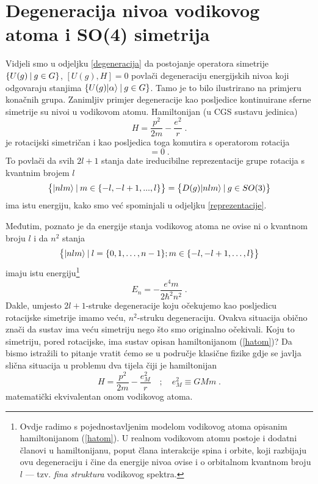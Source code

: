 \section{Degeneracija nivoa vodikovog atoma i SO(4) simetrija}
\label{so4}


Vidjeli smo u odjeljku \ref{degeneracija} da postojanje operatora
simetrije $\{U(g) \: | \: g\in G \}$, $[U(g), H] = 0$ povlači degeneraciju
energijskih nivoa koji odgovaraju stanjima $\{U(g)| \alpha \rangle \: | \: g\in
G \}$. Tamo je to bilo ilustrirano na primjeru konačnih grupa. Zanimljiv
primjer degeneracije kao posljedice kontinuirane sferne simetrije su
nivoi u vodikovom atomu. Hamiltonijan (u CGS sustavu jedinica)
\begin{equation}
    H = \frac{p^2}{2m} - \frac{e^2}{r} \;.
\label{hatom}
\end{equation}
je rotacijski simetričan i kao posljedica toga komutira s operatorom
rotacija
\begin{equation}
     [H, D(\vec{n},\phi)] = 0 \;.
\end{equation}
To povlači da svih $2l+1$ stanja date ireducibilne reprezentacije
grupe rotacija s kvantnim brojem $l$
\begin{equation}
   \big\{| nlm \rangle \: | \: m\in\{-l, -l+1, ..., l \}\big\} = 
   \big\{ D(g)| nlm \rangle \: | \: g \in SO(3) \big\}
\end{equation}
ima istu energiju, kako smo već spominjali u odjeljku \ref{reprezentacije}.

Međutim, poznato je da energije stanja vodikovog atoma ne
ovise ni o kvantnom broju $l$ i da $n^2$ stanja
\begin{equation}
\big\{| nlm \rangle \: | \: l=\{0, 1, \ldots, n-1\}; m\in\{-l, -l+1, \ldots, l \}\big\} 
\end{equation}
imaju istu energiju\footnote{Ovdje radimo s pojednostavljenim modelom vodikovog atoma
opisanim hamiltonijanom (\protect\ref{hatom}). U realnom vodikovom atomu
postoje i dodatni članovi u hamiltonijanu, poput člana interakcije spina
i orbite, koji razbijaju ovu degeneraciju i čine da energije nivoa ovise
i o orbitalnom kvantnom broju $l$ --- tzv. \emph{fina struktura} vodikovog
spektra.}
\begin{equation}
    E_n = - \frac{e^4 m}{2 \hbar^2 n^2}  \;.
\end{equation}
Dakle, umjesto $2l+1$-struke degeneracije koju očekujemo kao posljedicu
rotacijske simetrije imamo veću, $n^2$-struku degeneraciju. Ovakva
situacija obično znači da sustav ima veću simetriju nego što smo
originalno očekivali. Koju to simetriju, pored rotacijske, ima
sustav opisan hamiltonijanom (\ref{hatom})?
Da bismo istražili to pitanje vratit ćemo se u područje klasične
fizike gdje se javlja slična situacija u problemu dva tijela čiji
je hamiltonijan
\begin{equation}
    H = \frac{p^2}{2m} - \frac{e_{M}^2}{r} \quad ; \quad 
 e_{M}^2 \equiv G M m \;.
\end{equation}
matematički ekvivalentan onom vodikovog atoma.

